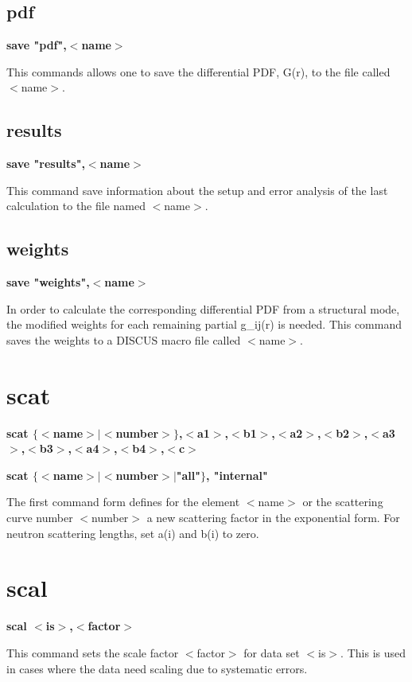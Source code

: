 \subsection*{pdf}
{\bf save "pdf",$ <$name$> $ \par }
\par
\vspace{3pt}
This commands allows one to save the differential PDF, G(r), to 
the file called $ <$name$> $. 
\subsection*{results}
{\bf save "results",$ <$name$> $ \par }
\par
\vspace{3pt}
This command save information about the setup and error analysis 
of the last calculation to the file named $ <$name$> $. 
\subsection*{weights}
{\bf save "weights",$ <$name$> $ \par }
\par
\vspace{3pt}
In order to calculate the corresponding differential PDF from a 
structural mode, the modified weights for each remaining partial 
g\_ij(r) is needed. This command saves the weights to a DISCUS 
macro file called $ <$name$> $. 
\section{scat}
{\bf scat $ \{$$ <$name$> $$| $$ <$number$> $$\} $,$ <$a1$> $,$ <$b1$> $,$ <$a2$> $,$ <$b2$> $,$ <$a3$> $,$ <$b3$> $,$ <$a4$> $,$ <$b4$> $,$ <$c$> $ \par }
{\bf scat $ \{$$ <$name$> $$| $$ <$number$> $$| $"all"$\} $, "internal" \par }
\par
\vspace{3pt}
The first command form defines for the element $ <$name$> $ or the scattering 
curve number $ <$number$> $ a new scattering factor in the exponential form. 
For neutron scattering lengths, set a(i) and b(i) to zero. 
\section{scal}
{\bf scal $ <$is$> $,$ <$factor$> $ \par }
\par
\vspace{3pt}
This command sets the scale factor $ <$factor$> $ for data set $ <$is$> $. 
This is used in cases where the data need scaling due to systematic 
errors. 
